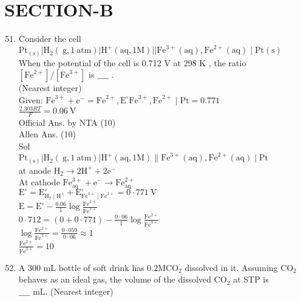 \documentclass[10pt]{article}
\begin{document}
\section*{SECTION-B}
\begin{enumerate}
  \setcounter{enumi}{50}
  \item Consider the cell\\
\(\mathrm{Pt}_{(\mathrm{s})}\left|\mathrm{H}_{2}(\mathrm{~g}, 1 \mathrm{~atm})\right| \mathrm{H}^{+}(\mathrm{aq}, 1 \mathrm{M})| | \mathrm{Fe}^{3+}(\mathrm{aq}), \mathrm{Fe}^{2+}(\mathrm{aq}) \mid \mathrm{Pt}(\mathrm{s})\)\\
When the potential of the cell is 0.712 V at 298 K , the ratio \(\left[\mathrm{Fe}^{2+}\right] /\left[\mathrm{Fe}^{3+}\right]\) is \(\_\_\_\_\) .\\
(Nearest integer)\\
Given: \(\mathrm{Fe}^{3+}+\mathrm{e}^{-}=\mathrm{Fe}^{2+}, \mathrm{E}^{\circ} \mathrm{Fe}^{3+}, \mathrm{Fe}^{2+} \mid \mathrm{Pt}=0.771\)\\
\(\frac{2.303 R T}{F}=0.06 \mathrm{~V}\)\\
Official Ans. by NTA (10)\\
Allen Ans. (10)\\
Sol\\
\(\mathrm{Pt}_{(\mathrm{s})}\left|\mathrm{H}_{2}(\mathrm{~g}, 1 \mathrm{~atm})\right| \mathrm{H}^{+}(\mathrm{aq}, 1 \mathrm{M}) \| \mathrm{Fe}^{3+}(\mathrm{aq}), \mathrm{Fe}^{2+}(\mathrm{aq}) \mid \mathrm{Pt}\)\\
at anode \(\mathrm{H}_{2} \longrightarrow 2 \mathrm{H}^{+}+2 \mathrm{e}^{-}\)\\
At cathode \(\mathrm{Fe}_{\mathrm{aq}}^{3+}+\mathrm{e}^{-} \longrightarrow \mathrm{Fe}_{\mathrm{aq}}^{2+}\)\\
\(\mathrm{E}^{\circ}=\mathrm{E}_{\mathrm{H}_{2} \mid \mathrm{H}^{+}}^{\circ}+\mathrm{E}_{\mathrm{Fe}^{3+} \mid \mathrm{Fe}^{2+}}^{\circ}=0 \cdot 771 \mathrm{~V}\)\\
\(\mathrm{E}=\mathrm{E}^{\circ}-\frac{0.06}{1} \log \frac{\mathrm{Fe}^{2+}}{\mathrm{Fe}^{3+}}\)\\
\(0 \cdot 712=(0+0 \cdot 771)-\frac{0 \cdot 06}{1} \log \frac{\mathrm{Fe}^{2+}}{\mathrm{Fe}^{3+}}\)\\
\(\log \frac{\mathrm{Fe}^{2+}}{\mathrm{Fe}^{3+}}=\frac{0 \cdot 059}{0 \cdot 06} \approx 1\)\\
\(\frac{\mathrm{Fe}^{2+}}{\mathrm{Fe}^{3+}}=10\)
  \item A 300 mL bottle of soft drink has \(0.2 \mathrm{M} \mathrm{CO}_{2}\) dissolved in it. Assuming \(\mathrm{CO}_{2}\) behaves as an ideal gas, the volume of the dissolved \(\mathrm{CO}_{2}\) at STP is\\
\(\_\_\_\_\) mL. (Nearest integer)
\end{enumerate}
\end{document}
